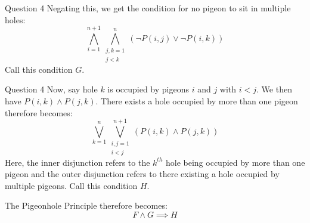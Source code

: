 \documentclass{beamer}
\begin{document}
{\begin{frame}{Question 4}
            Negating this, we get the condition for no pigeon to sit in multiple holes:
            \begin{equation*}
                \bigwedge\limits_{i = 1}^{n + 1} \bigwedge\limits_{\substack{j, k = 1\\j < k}}^{n} \left(\neg P(i, j) \lor \neg P(i, k)\right)
            \end{equation*}
            Call this condition $G$.
        \end{frame}
        \begin{frame}{Question 4}
            Now, say hole $k$ is occupied by pigeons $i$ and $j$ with $i < j$. We then have $P(i, k) \land P(j, k)$. There exists a hole occupied by more than one pigeon therefore becomes:
            \begin{equation*}
                \bigvee\limits_{k = 1}^{n}\bigvee\limits_{\substack{i, j = 1\\i < j}}^{n + 1} \left(P(i, k) \land P(j, k)\right)
            \end{equation*}
            Here, the inner disjunction refers to the $k^{th}$ hole being occupied by more than one pigeon and the outer disjunction refers to there existing a hole occupied by multiple pigeons. Call this condition $H$.
            
            The Pigeonhole Principle therefore becomes:
            \begin{equation*}
                F \land G \implies H
            \end{equation*}
        \end{frame}
    }
\end{document}

